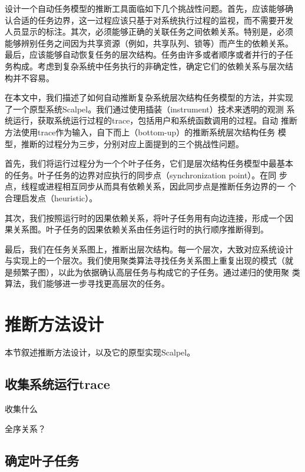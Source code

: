设计一个自动任务模型的推断工具面临如下几个挑战性问题。首先，应该能够确
认合适的任务边界，这一过程应该只基于对系统执行过程的监视，而不需要开发
人员显示的标注。其次，必须能够正确的关联任务之间依赖关系。特别是，必须
能够辨别任务之间因为共享资源（例如，共享队列、锁等）而产生的依赖关系。
最后，应该能够自动恢复任务的层次结构。任务由许多或者顺序或者并行的子任
务构成。考虑到复杂系统中任务执行的非确定性，确定它们的依赖关系与层次结
构并不容易。

在本文中，我们描述了如何自动推断复杂系统层次结构任务模型的方法，并实现
了一个原型系统Scalpel。我们通过使用插装（instrument）技术来透明的观测
系统运行，获取系统运行过程的trace，包括用户和系统函数调用的过程。自动
推断方法使用trace作为输入，自下而上（bottom-up）的推断系统层次结构任务
模型，推断的过程分为三步，分别对应上面提到的三个挑战性问题。

首先，我们将运行过程分为一个个叶子任务，它们是层次结构任务模型中最基本
的任务。叶子任务的边界对应执行的同步点（synchronization point）。在同
步点，线程或进程相互同步从而具有依赖关系，因此同步点是推断任务边界的一
个合理启发点（heuristic）。

其次，我们按照运行时的因果依赖关系，将叶子任务用有向边连接，形成一个因
果关系图。叶子任务的因果依赖关系由任务运行时的执行顺序推断得到。

最后，我们在任务关系图上，推断出层次结构。每一个层次，大致对应系统设计
与实现上的一个层次。我们使用聚类算法寻找任务关系图上重复出现的模式（就
是频繁子图），以此为依据确认高层任务与构成它的子任务。通过递归的使用聚
类算法，我们能够进一步寻找更高层次的任务。




\section{推断方法设计}

本节叙述推断方法设计，以及它的原型实现\pozhehao{}Scalpel。

\subsection{收集系统运行trace}
收集什么

全序关系？



\subsection{确定叶子任务}

